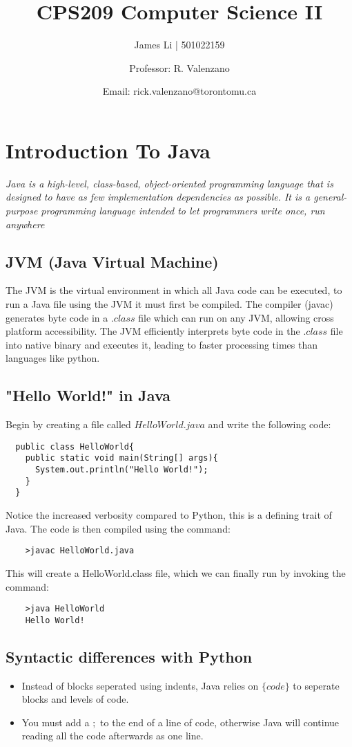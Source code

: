 \documentclass[a4paper]{article}
\title{CPS209 Computer Science II}
\author{James Li | 501022159 \and Professor: R. Valenzano\and Email: rick.valenzano@torontomu.ca}
\date{}
\begin{document}
  \maketitle
  \tableofcontents
  \newpage
  \section{Introduction To Java} 
  \textit{Java is a high-level, class-based, object-oriented programming language that is designed to have as few implementation dependencies as possible. It is a general-purpose programming language intended to let programmers write once, run anywhere}
  \subsection{JVM (Java Virtual Machine)}
  The JVM is the virtual environment in which all Java code can be executed, to run a Java file using the JVM it must first be compiled. The compiler (javac) generates byte code in a $.class$ file which can run on any JVM, allowing cross platform accessibility. The JVM efficiently interprets byte code in the $.class$ file into native binary and executes it, leading to faster processing times than languages like python.
  \subsection{"Hello World!" in Java}
  Begin by creating a file called $HelloWorld.java$ and write the following code:
  \begin{lstlisting}
  public class HelloWorld{
    public static void main(String[] args){
      System.out.println("Hello World!");
    }
  }
  \end{lstlisting}
  Notice the increased verbosity compared to Python, this is a defining trait of Java.
  The code is then compiled using the command:
  \begin{lstlisting}
    >javac HelloWorld.java
  \end{lstlisting}
  This will create a HelloWorld.class file, which we can finally run by invoking the command:
  \begin{lstlisting}
    >java HelloWorld
    Hello World!
  \end{lstlisting}
  \subsection{Syntactic differences with Python}
  \begin{itemize}
    \item Instead of blocks seperated using indents, Java relies on $\{code\}$ to seperate blocks and levels of code.
    \item You must add a $;$ to the end of a line of code, otherwise Java will continue reading all the code afterwards as one line.
  \end{itemize}
  
\end{document}
